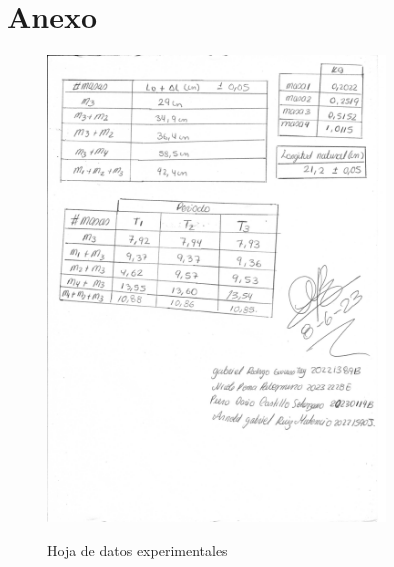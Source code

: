 \documentclass[12pt, a4paper]{article}
\begin{document}
\listoffigures
\listoftables

\clearpage

\section{Anexo}
\begin{figure}[H]
    \centering
    \includegraphics[width=0.8\textwidth]{resources/anexo.png}
    \label{img:annex}
    \caption{Hoja de datos experimentales}
\end{figure}
\end{document}
